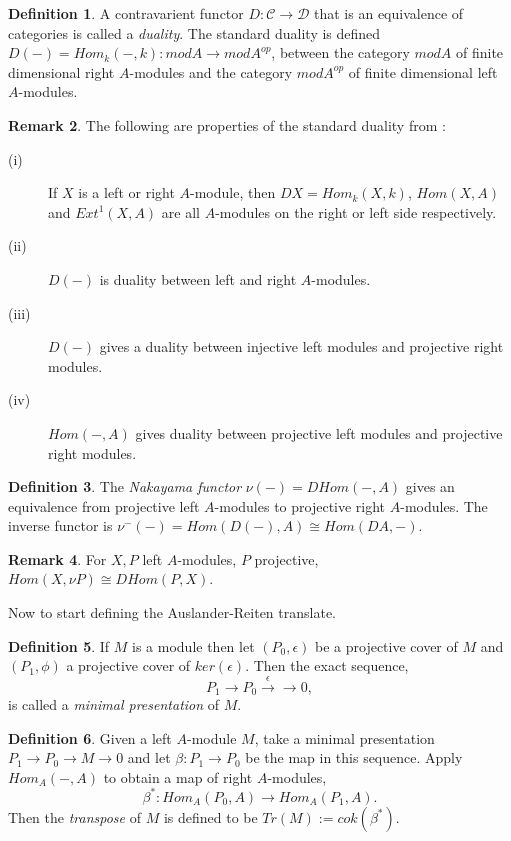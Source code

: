 \documentclass[11.5pt, twoside, a4paper, titlepage]{report}
\theoremstyle{definition}
\newtheorem{mydef}{Definition}[section]
\newtheorem{rem}[mydef]{Remark}
\theoremstyle{plain}
\begin{document}
\begin{mydef}
A contravarient functor $D: \mathcal{C} \to \mathcal{D}$ that is an equivalence of categories is called a \emph{duality}. The standard duality is defined $D(-)=Hom_k(-,k): mod A \to mod A^{op}$, between the category $modA$ of finite dimensional right $A$-modules and the category $modA^{op}$ of finite dimensional  left $A$-modules.
\end{mydef}

\begin{rem}
The following are properties of the standard duality from \cite{CB2}:
\begin{description}
\item [(i)] If $X$ is a left or right $A$-module, then $DX=Hom_k(X,k)$, $Hom(X,A)$ and $Ext^1(X,A)$ are all $A$-modules on the right or left side respectively.
\item [(ii)] $D(-)$ is duality between left and right $A$-modules.
\item [(iii)] $D(-)$ gives a duality between injective left modules and projective right modules.
\item [(iv)] $Hom(-,A)$ gives duality between projective left modules and projective right modules.
\end{description}
\end{rem}

\begin{mydef}
The \emph{Nakayama functor} $\nu(-)=DHom(-,A)$ gives an equivalence from projective left $A$-modules to projective right $A$-modules. The inverse functor is $\nu^-(-)=Hom(D(-),A)\cong Hom(DA,-)$.
\end{mydef}

\begin{rem}
For $X,P$ left $A$-modules, $P$ projective, $Hom(X,\nu P) \cong DHom(P,X)$.
\end{rem}

Now to start defining the Auslander-Reiten translate.

\begin{mydef}
If $M$ is a module then let $(P_0, \epsilon)$ be a projective cover of $M$ and $(P_1, \phi)$ a projective cover of $ker(\epsilon)$. Then the exact sequence, 
\begin{equation*}
P_1 \xrightarrow{} P_0 \xrightarrow{\epsilon} \xrightarrow{} 0,
\end{equation*}
is called a \emph{minimal presentation} of $M$. 
\end{mydef}

\begin{mydef}
Given a left $A$-module $M$, take a minimal presentation $P_1 \to P_0 \to M \to 0$ and let $\beta: P_1 \to P_0$ be the map in this sequence. Apply $Hom_A(-,A)$ to obtain a map of right $A$-modules,
\begin{equation*}
\beta^{\ast}: Hom_A(P_0, A) \to Hom_A(P_1, A).
\end{equation*}
Then the \emph{transpose} of $M$ is defined to be $Tr(M):=cok(\beta^{\ast})$.
\end{mydef}
\end{document}
